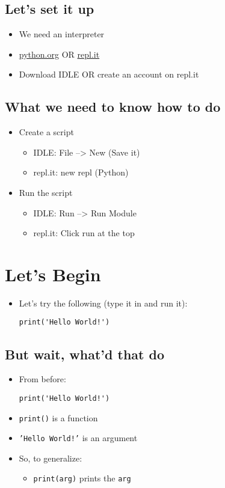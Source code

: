 \documentclass[11pt]{article}
\begin{document}
\subsection{Let's set it up}
\label{sec:org8091ae0}
\begin{itemize}
\item We need an interpreter
\item \href{https://python.org}{python.org} OR \href{https://repl.it}{repl.it}
\item Download IDLE OR create an account on repl.it
\end{itemize}
\subsection{What we need to know how to do}
\label{sec:org0da63c9}
\begin{itemize}
\item Create a script
\begin{itemize}
\item IDLE: File --> New (Save it)
\item repl.it: new repl (Python)
\end{itemize}
\item Run the script
\begin{itemize}
\item IDLE: Run --> Run Module
\item repl.it: Click run at the top
\end{itemize}
\end{itemize}
\section{Let's Begin}
\label{sec:org8744275}
\begin{itemize}
\item Let's try the following (type it in and run it):
\begin{verbatim}
print('Hello World!')
\end{verbatim}
\end{itemize}
\subsection{But wait, what'd that do}
\label{sec:org5584a39}
\begin{itemize}
\item From before:
\begin{verbatim}
print('Hello World!')
\end{verbatim}
\item \texttt{print()} is a function
\item \texttt{'Hello World!'} is an argument
\item So, to generalize:
\begin{itemize}
\item \texttt{print(arg)} prints the \texttt{arg}
\end{itemize}
\end{itemize}
\end{document}

